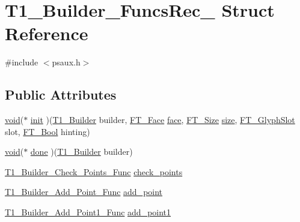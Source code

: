 \hypertarget{struct_t1___builder___funcs_rec__}{\section{T1\-\_\-\-Builder\-\_\-\-Funcs\-Rec\-\_\- Struct Reference}
\label{struct_t1___builder___funcs_rec__}
}


{\ttfamily \#include $<$psaux.\-h$>$}

\subsection*{Public Attributes}
\begin{DoxyCompactItemize}
\item 
\hyperlink{wglew_8h_aeea6e3dfae3acf232096f57d2d57f084}{void}($\ast$ \hyperlink{struct_t1___builder___funcs_rec___abdb04c5d1f2e281fa1a38ab03293ccb9}{init} )(\hyperlink{psaux_8h_a663b21b57e6b519b1d1b7a80939e5c7c}{T1\-\_\-\-Builder} builder, \hyperlink{freetype_8h_a7eba045ee20968354fa1bff0f69740fa}{F\-T\-\_\-\-Face} \hyperlink{glew_8h_a676ca580c460c0154eb58200433d2a9e}{face}, \hyperlink{freetype_8h_a791d0ff3273ca9628a523efd98d138c1}{F\-T\-\_\-\-Size} \hyperlink{_free_image_8h_a3d1e3edfcf61ca2d831883e1afbad89e}{size}, \hyperlink{freetype_8h_a768daa0d9c3fa499e6c37034ee9f2ca3}{F\-T\-\_\-\-Glyph\-Slot} slot, \hyperlink{fttypes_8h_a1a832a256bb5a7e6e884afaa1a07f3ae}{F\-T\-\_\-\-Bool} hinting)
\item 
\hyperlink{wglew_8h_aeea6e3dfae3acf232096f57d2d57f084}{void}($\ast$ \hyperlink{struct_t1___builder___funcs_rec___a1a95d417d9b6f04d8f5ab5998e2e2008}{done} )(\hyperlink{psaux_8h_a663b21b57e6b519b1d1b7a80939e5c7c}{T1\-\_\-\-Builder} builder)
\item 
\hyperlink{psaux_8h_ac02a84ab2aeecbf3a73b6aa0e4103779}{T1\-\_\-\-Builder\-\_\-\-Check\-\_\-\-Points\-\_\-\-Func} \hyperlink{struct_t1___builder___funcs_rec___a303aa60891edacdc0a9665663577a44a}{check\-\_\-points}
\item 
\hyperlink{psaux_8h_a434e152cca4651f0d604b8175a3524bf}{T1\-\_\-\-Builder\-\_\-\-Add\-\_\-\-Point\-\_\-\-Func} \hyperlink{struct_t1___builder___funcs_rec___a8f06e116ae86a88bb3d6d2ea5fd6fdd1}{add\-\_\-point}
\item 
\hyperlink{psaux_8h_a07009ab3075d4c3fa53d48e6123be2e3}{T1\-\_\-\-Builder\-\_\-\-Add\-\_\-\-Point1\-\_\-\-Func} \hyperlink{struct_t1___builder___funcs_rec___a52113cffcd739ad679c0b162dc81b530}{add\-\_\-point1}
\item 

\end{DoxyCompactItemize}
